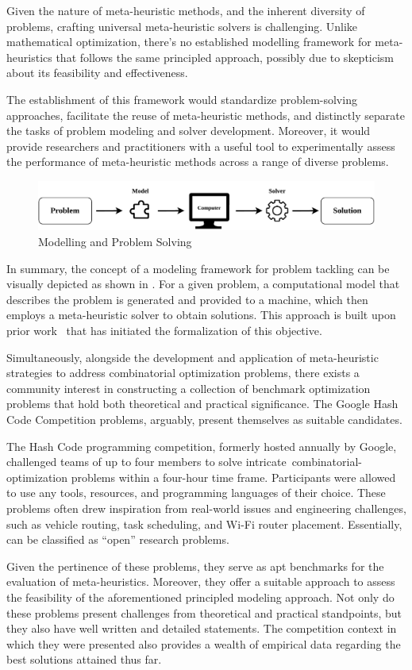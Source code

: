 Given the nature of meta-heuristic methods, and the inherent diversity of
problems, crafting universal meta-heuristic solvers is challenging.  Unlike
mathematical optimization, there's no established modelling framework for
meta-heuristics that follows the same principled approach, possibly due to
skepticism about its feasibility and effectiveness.

The establishment of this framework would standardize problem-solving
approaches, facilitate the reuse of meta-heuristic methods, and distinctly
separate the tasks of problem modeling and solver development. Moreover, it
would provide researchers and practitioners with a useful tool to experimentally
assess the performance of meta-heuristic methods across a range of diverse
problems.

\begin{figure}[h]
  \centering
  \includegraphics[width=\textwidth,keepaspectratio]{../assets/modelling/modelling.pdf}
  \caption{Modelling and Problem Solving}
  \label{fig:problem-solving}
\end{figure}

In summary, the concept of a modeling framework for problem tackling can be
visually depicted as shown in . For a given
problem, a computational model that describes the problem is generated and
provided to a machine, which then employs a meta-heuristic solver to obtain
solutions. This approach is built upon prior
work~\cite{vieira2009uma,outeiro2021application} that has initiated the
formalization of this objective.

Simultaneously, alongside the development and application of meta-heuristic
strategies to address combinatorial optimization problems, there exists a
community interest in constructing a collection of benchmark optimization
problems that hold both theoretical and practical significance. The Google Hash
Code Competition problems, arguably, present themselves as suitable candidates.

The Hash Code programming competition, formerly hosted annually by Google,
challenged teams of up to four members to solve
intricate~\acrshort{combinatorial-optimization} problems within a four-hour time
frame. Participants were allowed to use any tools, resources, and programming
languages of their choice. These problems often drew inspiration from real-world
issues and engineering challenges, such as vehicle routing, task scheduling, and
Wi-Fi router placement. Essentially, can be classified as ``open'' research
problems.

Given the pertinence of these problems, they serve as apt benchmarks for the
evaluation of meta-heuristics. Moreover, they offer a suitable approach to
assess the feasibility of the aforementioned principled modeling approach. Not
only do these problems present challenges from theoretical and practical
standpoints, but they also have well written and detailed statements. The
competition context in which they were presented also provides a wealth of
empirical data regarding the best solutions attained thus far.